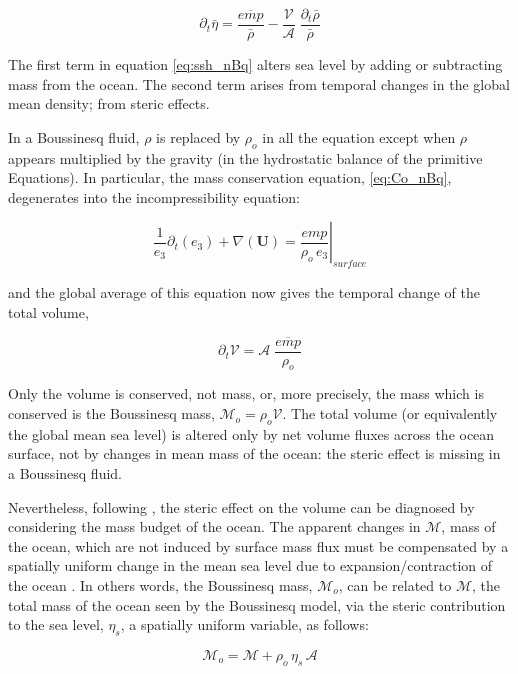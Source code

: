 \documentclass[../main/NEMO_manual]{subfiles}
\begin{document}
\begin{equation}
  \partial_t \bar{\eta} = \frac{\overline{\textit{emp}}}{ \bar{\rho}}
  - \frac{\mathcal{V}}{\mathcal{A}} \;\frac{\partial_t \bar{\rho} }{\bar{\rho}}
  \label{eq:ssh_nBq}
\end{equation}

The first term in equation \autoref{eq:ssh_nBq} alters sea level by adding or subtracting mass from the ocean. 
The second term arises from temporal changes in the global mean density; \ie from steric effects.

In a Boussinesq fluid, $\rho$ is replaced by $\rho_o$ in all the equation except when $\rho$ appears multiplied by
the gravity (\ie in the hydrostatic balance of the primitive Equations).
In particular, the mass conservation equation, \autoref{eq:Co_nBq}, degenerates into the incompressibility equation:

\[
  \frac{1}{e_3} \partial_t ( e_3 ) + \nabla( \textbf{U} ) = \left. \frac{\textit{emp}}{\rho_o \,e_3}\right|_ \textit{surface}
\]

and the global average of this equation now gives the temporal change of the total volume,

\[
  \partial_t \mathcal{V} = \mathcal{A} \;\frac{\overline{\textit{emp}}}{\rho_o}
\]

Only the volume is conserved, not mass, or, more precisely, the mass which is conserved is the Boussinesq mass,
$\mathcal{M}_o = \rho_o \mathcal{V}$.
The total volume (or equivalently the global mean sea level) is altered only by net volume fluxes across
the ocean surface, not by changes in mean mass of the ocean: the steric effect is missing in a Boussinesq fluid.

Nevertheless, following \citep{Greatbatch_JGR94}, the steric effect on the volume can be diagnosed by
considering the mass budget of the ocean. 
The apparent changes in $\mathcal{M}$, mass of the ocean, which are not induced by surface mass flux
must be compensated by a spatially uniform change in the mean sea level due to expansion/contraction of the ocean
\citep{Greatbatch_JGR94}.
In others words, the Boussinesq mass, $\mathcal{M}_o$, can be related to $\mathcal{M}$,
the total mass of the ocean seen by the Boussinesq model, via the steric contribution to the sea level,
$\eta_s$, a spatially uniform variable, as follows:

\begin{equation}
  \mathcal{M}_o = \mathcal{M} + \rho_o \,\eta_s \,\mathcal{A}
  \label{eq:M_Bq}
\end{equation}
\end{document}
